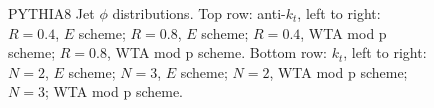 \begin{figure}[H]
\hfill
{}\hfill
\caption{PYTHIA8 Jet $\phi$ distributions. Top row: anti-$k_t$, left to right: $R=0.4$, $E$ scheme; $R=0.8$, $E$ scheme; $R=0.4$, WTA mod p scheme; $R=0.8$, WTA mod p scheme. Bottom row: $k_t$, left to right: $N=2$, $E$ scheme; $N=3$, $E$ scheme; $N=2$, WTA mod p scheme; $N=3$; WTA mod p scheme.}  
\end{figure}

